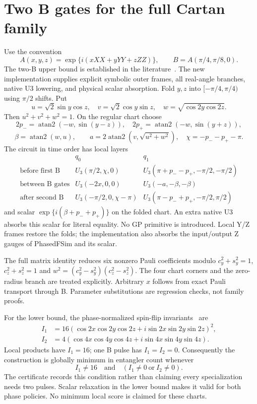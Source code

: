 \documentclass[11pt]{article}
\begin{document}
\section{Two B gates for the full Cartan family}
Use the convention
\[
 A(x,y,z)=\exp\{i(xXX+yYY+zZZ)\},\qquad B=A(\pi/4,\pi/8,0).
\]
The two-B upper bound is established in the literature~\cite{b}. The new
implementation supplies explicit symbolic outer frames, all real-angle
branches, native U3 lowering, and physical scalar absorption.
Fold $y,z$ into $[-\pi/4,\pi/4)$ using $\pi/2$ shifts. Put
\[
 u=\sqrt2\sin y\cos z,\quad v=\sqrt2\cos y\sin z,\quad
 w=\sqrt{\cos2y\cos2z}.
\]
Then $u^2+v^2+w^2=1$. On the regular chart choose
\[
 2p_- =\operatorname{atan2}(-w,\sin(y-z)),\quad
 2p_+ =\operatorname{atan2}(-w,\sin(y+z)),
\]
\[
 \beta=\operatorname{atan2}(w,u),\qquad
 a=2\operatorname{atan2}(v,\sqrt{u^2+w^2}),\quad
 \chi=-p_--p_+-\pi.
\]
The circuit in time order has local layers
\[
\begin{array}{c|cc}
 &q_0&q_1\\\hline
\text{before first B}&U_3(\pi/2,\chi,0)&U_3(\pi+p_--p_+,-\pi/2,-\pi/2)\\
\text{between B gates}&U_3(-2x,0,0)&U_3(-a,-\beta,-\beta)\\
\text{after second B}&U_3(-\pi/2,0,\chi-\pi)&U_3(\pi-p_-+p_+,-\pi/2,\pi/2)
\end{array}
\]
and scalar $\exp\{i(\beta+p_-+p_+)\}$ on the folded chart.
An extra native U3 absorbs this scalar for literal equality. No GP primitive
is introduced. Local Y/Z frames restore the folds; the implementation also
absorbs the input/output Z gauges of PhasedFSim and its scalar.

The full matrix identity reduces six nonzero Pauli coefficients modulo
$c_y^2+s_y^2=1$, $c_z^2+s_z^2=1$ and
$w^2=(c_y^2-s_y^2)(c_z^2-s_z^2)$. The four chart corners and the zero-radius
branch are treated explicitly. Arbitrary $x$ follows from exact Pauli transport
through B. Parameter substitutions are regression checks, not family proofs.

For the lower bound, the phase-normalized spin-flip invariants~\cite{makhlin}
are
\begin{align*}
 I_1&=16(\cos2x\cos2y\cos2z+i\sin2x\sin2y\sin2z)^2,\\
 I_2&=4(\cos4x\cos4y\cos4z+i\sin4x\sin4y\sin4z).
\end{align*}
Local products have $I_1=16$; one B pulse has $I_1=I_2=0$.
Consequently the construction is globally minimum in entangler count whenever
\[
 I_1\ne16\quad\text{and}\quad(I_1\ne0\ \text{or}\ I_2\ne0).
\]
The certificate records this condition rather than claiming every specialization
needs two pulses. Scalar relaxation in the lower bound makes it valid for
both phase policies. No minimum local score is claimed for these charts.
\end{document}
